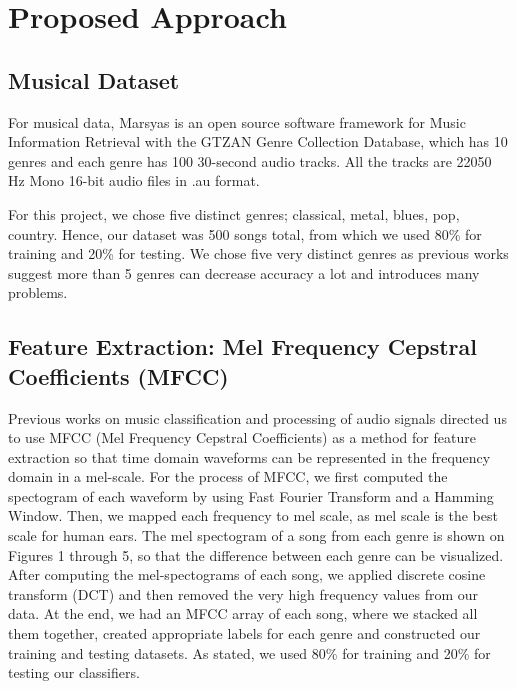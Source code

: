 \section{Proposed Approach}\label{sec:approach}
\subsection{Musical Dataset}
For musical data, Marsyas is an open source software framework for Music Information Retrieval with the GTZAN Genre Collection Database, which has 10 genres and each genre has 100 30-second audio tracks. All the tracks are 22050 Hz Mono 16-bit audio files in .au format. 

For this project, we chose five distinct genres; classical, metal, blues, pop, country. Hence, our dataset was 500 songs total, from which we used 80\% for training and 20\% for testing. We chose five very distinct genres as previous works \cite{Chun:2010} suggest more than 5 genres can decrease accuracy a lot and introduces many problems. 

\subsection{Feature Extraction: Mel Frequency Cepstral Coefficients (MFCC)}
Previous works \cite{MFCC:2011} on music classification and processing of audio signals directed us to use MFCC (Mel Frequency Cepstral Coefficients) as a method for feature extraction so that time domain waveforms can be represented in the frequency domain in a mel-scale. For the process of MFCC, we first computed the spectogram of each waveform by using Fast Fourier Transform and a Hamming Window. Then, we mapped each frequency to mel scale, as mel scale is the best scale for human ears. The mel spectogram of a song from each genre is shown on Figures 1 through 5, so that the difference between each genre can be visualized. After computing the mel-spectograms of each song, we applied discrete cosine transform (DCT) and then removed the very high frequency values from our data. At the end, we had an MFCC array of each song, where we stacked all them together, created appropriate labels for each genre and constructed our training and testing datasets. As stated, we used 80\% for training and 20\% for testing our classifiers. 


